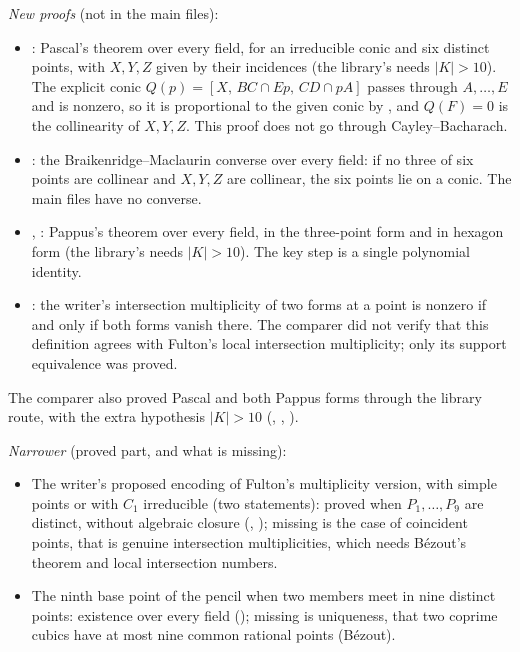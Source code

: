 \documentclass[11pt]{article}
\theoremstyle{definition}
\theoremstyle{remark}
\begin{document}
\emph{New proofs} (not in the main files):
\begin{itemize}
\item {}: Pascal's theorem over every field, for an irreducible conic and six distinct
points, with $X,Y,Z$ given by their incidences (the library's  needs $|K|>10$). The
explicit conic $Q(p)=[X,\,BC\cap Ep,\,CD\cap pA]$ passes through $A,\dots,E$ and is nonzero, so it is
proportional to the given conic by , and $Q(F)=0$ is the collinearity of $X,Y,Z$. This
proof does not go through Cayley--Bacharach.
\item {}: the Braikenridge--Maclaurin converse over every field: if no three of six points
are collinear and $X,Y,Z$ are collinear, the six points lie on a conic. The main files have no converse.
\item {}, : Pappus's theorem over every field, in the three-point form and
in hexagon form (the library's  needs $|K|>10$). The key step  is a
single polynomial identity.
\item {}: the writer's intersection multiplicity of two forms at a point is
nonzero if and only if both forms vanish there. The comparer did not verify that this definition
agrees with Fulton's local intersection multiplicity; only its support equivalence was proved.
\end{itemize}
The comparer also proved Pascal and both Pappus forms through the library route, with the extra
hypothesis $|K|>10$ (, , ).

\emph{Narrower} (proved part, and what is missing):
\begin{itemize}
\item The writer's proposed encoding of Fulton's multiplicity version, with simple points or with $C_1$ irreducible (two statements):
proved when $P_1,\dots,P_9$ are distinct, without algebraic closure (,
); missing is the case of coincident points, that is genuine
intersection multiplicities, which needs B\'ezout's theorem and local intersection numbers.
\item The ninth base point of the pencil when two members meet in nine distinct points: existence over
every field (); missing is uniqueness, that two coprime cubics have at most
nine common rational points (B\'ezout).
\end{itemize}
\end{document}
